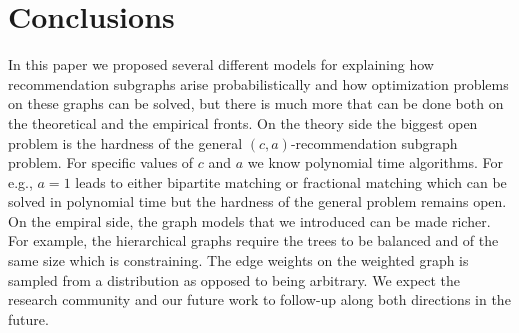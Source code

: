 \section{Conclusions}

In this paper we proposed several different models for explaining how
recommendation subgraphs arise probabilistically and how optimization
problems on these graphs can be solved, but there is much more that
can be done both on the theoretical and the empirical fronts. On the
theory side the biggest open problem is the hardness of the general
$(c, a)$-recommendation subgraph problem. For specific values of $c$
and $a$ we know polynomial time algorithms. For e.g., $a=1$ leads to
either bipartite matching or fractional matching which can be solved
in polynomial time but the hardness of the general problem remains
open. On the empiral side, the graph models that we introduced can be
made richer. For example, the hierarchical graphs require the trees to
be balanced and of the same size which is constraining. The edge
weights on the weighted graph is sampled from a distribution as
opposed to being arbitrary. We expect the research community and our
future work to follow-up along both directions in the future.







